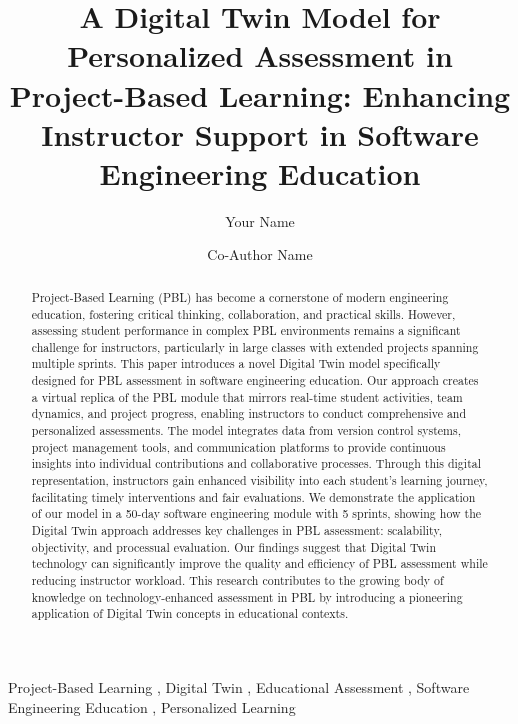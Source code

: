 \documentclass[review]{elsarticle}
\begin{document}
\begin{frontmatter}

\title{A Digital Twin Model for Personalized Assessment in Project-Based Learning: Enhancing Instructor Support in Software Engineering Education}

\author[inst1]{Your Name}

\author[inst1]{Co-Author Name}



\begin{abstract}
Project-Based Learning (PBL) has become a cornerstone of modern engineering education, fostering critical thinking, collaboration, and practical skills. However, assessing student performance in complex PBL environments remains a significant challenge for instructors, particularly in large classes with extended projects spanning multiple sprints. This paper introduces a novel Digital Twin model specifically designed for PBL assessment in software engineering education. Our approach creates a virtual replica of the PBL module that mirrors real-time student activities, team dynamics, and project progress, enabling instructors to conduct comprehensive and personalized assessments. The model integrates data from version control systems, project management tools, and communication platforms to provide continuous insights into individual contributions and collaborative processes. Through this digital representation, instructors gain enhanced visibility into each student's learning journey, facilitating timely interventions and fair evaluations. We demonstrate the application of our model in a 50-day software engineering module with 5 sprints, showing how the Digital Twin approach addresses key challenges in PBL assessment: scalability, objectivity, and processual evaluation. Our findings suggest that Digital Twin technology can significantly improve the quality and efficiency of PBL assessment while reducing instructor workload. This research contributes to the growing body of knowledge on technology-enhanced assessment in PBL by introducing a pioneering application of Digital Twin concepts in educational contexts.
\end{abstract}

\begin{keyword}
Project-Based Learning \sep
Digital Twin \sep
Educational Assessment \sep
Software Engineering Education \sep
Personalized Learning
\end{keyword}

\end{frontmatter}
\end{document}
